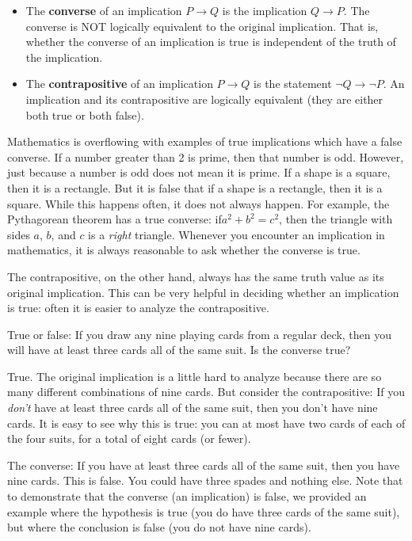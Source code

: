 \documentclass[11pt,]{book}
\newcommand{\terminology}[1]{\textbf{#1}}
\theoremstyle{ptxplainnotitle}
\theoremstyle{ptxplaintitle}
\theoremstyle{ptxdefinitionnotitle}
\theoremstyle{ptxdefinitiontitle}
\theoremstyle{ptxdefinitionnotitle}
\theoremstyle{ptxdefinitiontitle}
\theoremstyle{ptxdefinitionnotitle}
\theoremstyle{ptxdefinitiontitle}
\theoremstyle{ptxdefinitiontitlenonumber}
\theoremstyle{ptxdefinitiontitlenonumber}
\numberwithin{equation}{chapter}
\newcommand{\imp}{\rightarrow}
\begin{document}
\begin{assemblage}\label{assemblage-29}
\hypertarget{p-1770}{}%
%
\begin{itemize}[label=\textbullet]
\item{}\hypertarget{p-1771}{}%
The \terminology{converse}  of an implication \(P \imp Q\) is the implication \(Q \imp P\). The converse is NOT logically equivalent to the original implication.  That is, whether the converse of an implication is true is independent of the truth of the implication.%
\item{}\hypertarget{p-1772}{}%
The \terminology{contrapositive}  of an implication \(P \imp Q\) is the statement \(\neg Q \imp \neg P\). An implication and its contrapositive are logically equivalent (they are either both true or both false).%
\end{itemize}
%
\end{assemblage}
\hypertarget{p-1773}{}%
Mathematics is overflowing with examples of true implications which have a false converse. If a number greater than 2 is prime, then that number is odd. However, just because a number is odd does not mean it is prime. If a shape is a square, then it is a rectangle. But it is false that if a shape is a rectangle, then it is a square. While this happens often, it does not always happen. For example, the Pythagorean theorem has a true converse: if\(a^2 + b^2 = c^2\), then the triangle with sides \(a\), \(b\), and \(c\) is a \emph{right} triangle. Whenever you encounter an implication in mathematics, it is always reasonable to ask whether the converse is true.%
\par
\hypertarget{p-1774}{}%
The contrapositive, on the other hand, always has the same truth value as its original implication. This can be very helpful in deciding whether an implication is true: often it is easier to analyze the contrapositive.%
\begin{example}\label{example-51}
\hypertarget{p-1775}{}%
True or false: If you draw any nine playing cards from a regular deck, then you will have at least three cards all of the same suit. Is the converse true?%
\par\smallskip%
\noindent\textbf{}\hypertarget{solution-218}{}\hypertarget{p-1776}{}%
True. The original implication is a little hard to analyze because there are so many different combinations of nine cards. But consider the contrapositive: If you \emph{don't} have at least three cards all of the same suit, then you don't have nine cards. It is easy to see why this is true: you can at most have two cards of each of the four suits, for a total of eight cards (or fewer).%
\par
\hypertarget{p-1777}{}%
The converse: If you have at least three cards all of the same suit, then you have nine cards. This is false. You could have three spades and nothing else. Note that to demonstrate that the converse (an implication) is false, we provided an example where the hypothesis is true (you do have three cards of the same suit), but where the conclusion is false (you do not have nine cards).%
\end{example}
\end{document}
